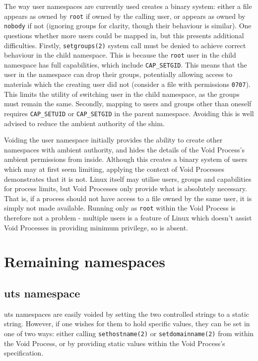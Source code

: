 \documentclass[12pt,a4paper,twoside]{report}
\begin{document}
The way user namespaces are currently used creates a binary system: either a file appears as owned by \texttt{root} if owned by the calling user, or appears as owned by \texttt{nobody} if not (ignoring groups for clarity, though their behaviour is similar). One questions whether more users could be mapped in, but this presents additional difficulties. Firstly, \texttt{setgroups(2)} system call must be denied to achieve correct behaviour in the child namespace. This is because the \texttt{root} user in the child namespace has full capabilities, which include \texttt{CAP\_SETGID}. This means that the user in the namespace can drop their groups, potentially allowing access to materials which the creating user did not (consider a file with permissions \texttt{0707}). This limits the utility of switching user in the child namespace, as the groups must remain the same. Secondly, mapping to users and groups other than oneself requires \texttt{CAP\_SETUID} or \texttt{CAP\_SETGID} in the parent namespace. Avoiding this is well advised to reduce the ambient authority of the shim.

Voiding the user namespace initially provides the ability to create other namespaces with ambient authority, and hides the details of the Void Process's ambient permissions from inside. Although this creates a binary system of users which may at first seem limiting, applying the context of Void Processes demonstrates that it is not. Linux itself may utilise users, groups and capabilities for process limits, but Void Processes only provide what is absolutely necessary. That is, if a process should not have access to a file owned by the same user, it is simply not made available. Running only as \texttt{root} within the Void Process is therefore not a problem - multiple users is a feature of Linux which doesn't assist Void Processes in providing minimum privilege, so is absent.

\section{Remaining namespaces}

\subsection{uts namespace}
\label{sec:filling-uts}

uts namespaces are easily voided by setting the two controlled strings to a static string. However, if one wishes for them to hold specific values, they can be set in one of two ways: either calling \texttt{sethostname(2)} or \texttt{setdomainname(2)} from within the Void Process, or by providing static values within the Void Process's specification.
\end{document}
